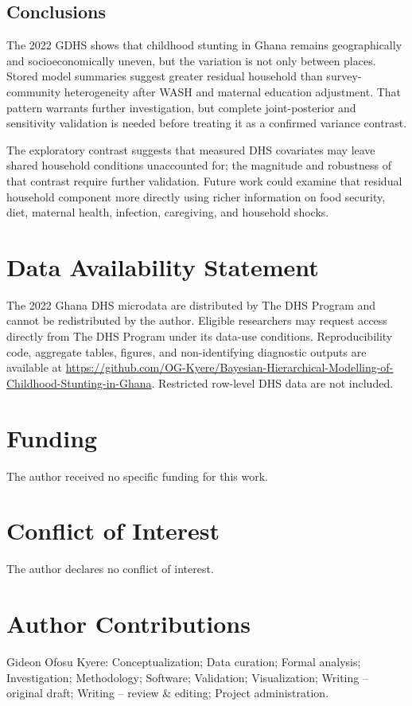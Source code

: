 \documentclass[11pt]{article}
\begin{document}
\subsection{Conclusions}

The 2022 GDHS shows that childhood stunting in Ghana remains geographically and socioeconomically uneven, but the variation is not only between places. Stored model summaries suggest greater residual household than survey-community heterogeneity after WASH and maternal education adjustment. That pattern warrants further investigation, but complete joint-posterior and sensitivity validation is needed before treating it as a confirmed variance contrast.

The exploratory contrast suggests that measured DHS covariates may leave shared household conditions unaccounted for; the magnitude and robustness of that contrast require further validation. Future work could examine that residual household component more directly using richer information on food security, diet, maternal health, infection, caregiving, and household shocks.


\section*{Data Availability Statement}
The 2022 Ghana DHS microdata are distributed by The DHS Program and cannot be redistributed by the author. Eligible researchers may request access directly from The DHS Program under its data-use conditions. Reproducibility code, aggregate tables, figures, and non-identifying diagnostic outputs are available at \url{https://github.com/OG-Kyere/Bayesian-Hierarchical-Modelling-of-Childhood-Stunting-in-Ghana}. Restricted row-level DHS data are not included.

\section*{Funding}
The author received no specific funding for this work.

\section*{Conflict of Interest}
The author declares no conflict of interest.

\section*{Author Contributions}
Gideon Ofosu Kyere: Conceptualization; Data curation; Formal analysis; Investigation; Methodology; Software; Validation; Visualization; Writing -- original draft; Writing -- review \& editing; Project administration.
\end{document}
